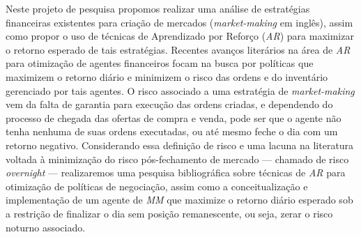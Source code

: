 Neste projeto de pesquisa propomos realizar uma análise de estratégias financeiras existentes para criação de mercados (\textit{market-making} em inglês), assim como propor o uso de técnicas de Aprendizado por Reforço (\textit{AR}) para maximizar o retorno esperado de tais estratégias. Recentes avanços literários na área de \textit{AR} para otimização de agentes financeiros focam na busca por políticas que maximizem o retorno diário e minimizem o risco das ordens e do inventário gerenciado por tais agentes. O risco associado a uma estratégia de \textit{market-making} vem da falta de garantia para execução das ordens criadas, e dependendo do processo de chegada das ofertas de compra e venda, pode ser que o agente não tenha nenhuma de suas ordens executadas, ou até mesmo feche o dia com um retorno negativo. Considerando essa definição de risco e uma lacuna na literatura voltada à minimização do risco pós-fechamento de mercado — chamado de risco \textit{overnight} — realizaremos uma pesquisa bibliográfica sobre técnicas de \textit{AR} para otimização de políticas de negociação, assim como a conceitualização e implementação de um agente de \textit{MM} que maximize o retorno diário esperado sob a restrição de finalizar o dia sem posição remanescente, ou seja, zerar o risco noturno associado. 
%